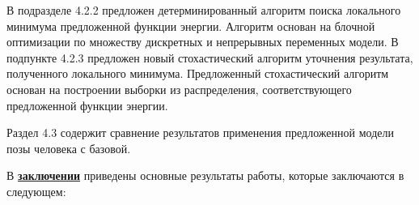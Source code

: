В подразделе 4.2.2 предложен детерминированный алгоритм поиска локального минимума предложенной функции энергии. Алгоритм основан на блочной оптимизации по множеству дискретных и непрерывных переменных модели. В подпункте 4.2.3 предложен новый стохастический алгоритм уточнения результата, полученного локального минимума. Предложенный стохастический алгоритм основан на построении выборки из распределения, соответствующего предложенной функции энергии.

Раздел 4.3 содержит сравнение результатов применения предложенной модели позы человека с базовой.

В \underline{\textbf{заключении}} приведены основные результаты работы, которые заключаются в следующем:


\iffalse
При использовании пакета \verb!biblatex! список публикаций автора по теме
диссертации формируется в разделе <<\publications>>\ файла
\verb!../common/characteristic.tex!  при помощи команды \verb!\nocite! 
\fi


